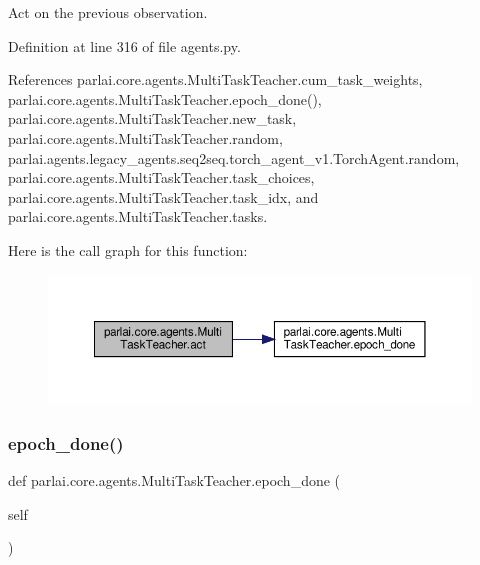 \begin{DoxyVerb}Act on the previous observation.\end{DoxyVerb}
 

Definition at line 316 of file agents.\+py.



References parlai.\+core.\+agents.\+Multi\+Task\+Teacher.\+cum\+\_\+task\+\_\+weights, parlai.\+core.\+agents.\+Multi\+Task\+Teacher.\+epoch\+\_\+done(), parlai.\+core.\+agents.\+Multi\+Task\+Teacher.\+new\+\_\+task, parlai.\+core.\+agents.\+Multi\+Task\+Teacher.\+random, parlai.\+agents.\+legacy\+\_\+agents.\+seq2seq.\+torch\+\_\+agent\+\_\+v1.\+Torch\+Agent.\+random, parlai.\+core.\+agents.\+Multi\+Task\+Teacher.\+task\+\_\+choices, parlai.\+core.\+agents.\+Multi\+Task\+Teacher.\+task\+\_\+idx, and parlai.\+core.\+agents.\+Multi\+Task\+Teacher.\+tasks.

Here is the call graph for this function\+:
\nopagebreak
\begin{figure}[H]
\begin{center}
\leavevmode
\includegraphics[width=350pt]{classparlai_1_1core_1_1agents_1_1MultiTaskTeacher_a29a2c8f7679aafd2d67b4b0db54d58a3_cgraph}
\end{center}
\end{figure}
\mbox{\label{classparlai_1_1core_1_1agents_1_1MultiTaskTeacher_a17444e342ab19c23cee28bba08a64df9}} 
\subsubsection{\texorpdfstring{epoch\+\_\+done()}{epoch\_done()}}
{\footnotesize\ttfamily def parlai.\+core.\+agents.\+Multi\+Task\+Teacher.\+epoch\+\_\+done (\begin{DoxyParamCaption}\item[{}]{self }\end{DoxyParamCaption})}

